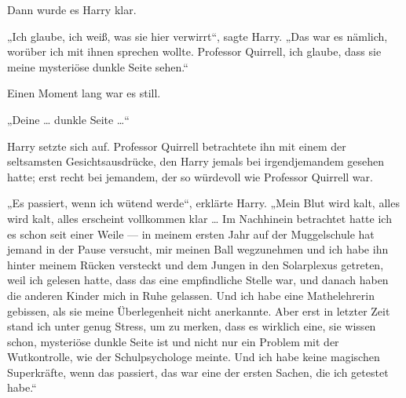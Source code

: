 Dann wurde es Harry klar.

„Ich glaube, ich weiß, was sie hier verwirrt“, sagte Harry.
„Das war es nämlich, worüber ich mit ihnen sprechen wollte. Professor Quirrell, ich glaube, dass sie meine mysteriöse dunkle Seite sehen.“

Einen Moment lang war es still.

„Deine … dunkle Seite …“

Harry setzte sich auf. Professor Quirrell betrachtete ihn mit einem der seltsamsten Gesichtsausdrücke, den Harry jemals bei irgendjemandem gesehen hatte; erst recht bei jemandem, der so würdevoll wie Professor Quirrell war.

„Es passiert, wenn ich wütend werde“, erklärte Harry.
„Mein Blut wird kalt, alles wird kalt, alles erscheint vollkommen klar … Im Nachhinein betrachtet hatte ich es schon seit einer Weile — in meinem ersten Jahr auf der Muggelschule hat jemand in der Pause versucht, mir meinen Ball wegzunehmen und ich habe ihn hinter meinem Rücken versteckt und dem Jungen in den Solarplexus getreten, weil ich gelesen hatte, dass das eine empfindliche Stelle war, und danach haben die anderen Kinder mich in Ruhe gelassen. Und ich habe eine Mathelehrerin gebissen, als sie meine Überlegenheit nicht anerkannte. Aber erst in letzter Zeit stand ich unter genug Stress, um zu merken, dass es wirklich eine, sie wissen schon, mysteriöse dunkle Seite ist und nicht nur ein Problem mit der Wutkontrolle, wie der Schulpsychologe meinte. Und ich habe keine magischen Superkräfte, wenn das passiert, das war eine der ersten Sachen, die ich getestet habe.“

